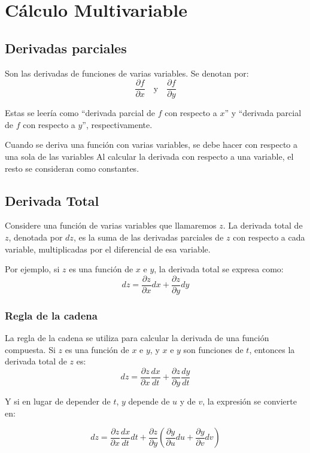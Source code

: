 \section{Cálculo Multivariable}
\subsection{Derivadas parciales}

Son las derivadas de funciones de varias variables. 
Se denotan por:
\[
\frac{\partial f}{\partial x} \quad \text{y} \quad \frac{\partial f}{\partial y}
\]

Estas se leería como ``derivada parcial de \(f\) con respecto a \(x\)'' y ``derivada parcial de \(f\) con respecto a \(y\)'', respectivamente.

Cuando se deriva una función con varias variables, se debe hacer con respecto a una sola de las variables
Al calcular la derivada con respecto a una variable, el resto se consideran como constantes.

\subsection{Derivada Total}
Considere una función de varias variables que llamaremos \(z\).
La derivada total de \(z\), denotada por \(dz\), es la suma de las derivadas parciales de \(z\) con respecto a cada variable, multiplicadas por el diferencial de esa variable.

Por ejemplo, si \(z\) es una función de \(x\) e \(y\), la derivada total se expresa como:
\[
dz = \frac{\partial z}{\partial x} dx + \frac{\partial z}{\partial y} dy
\]

\subsubsection{Regla de la cadena}
La regla de la cadena se utiliza para calcular la derivada de una función compuesta.
Si \(z\) es una función de \(x\) e \(y\), y \(x\) e \(y\) son funciones de \(t\), entonces la derivada total de \(z\) es:
\[
dz = \frac{\partial z}{\partial x} \frac{dx}{dt} + \frac{\partial z}{\partial y} \frac{dy}{dt}
\]

Y si en lugar de depender de \(t\), \(y\) depende de \(u\) y de \(v\), la expresión se convierte en:

\[
dz = \frac{\partial z}{\partial x} \frac{d x}{d t} dt  + \frac{\partial z}{\partial y}\left(\frac{\partial y}{\partial u} du + \frac{\partial y}{\partial v} dv\right)
\]

